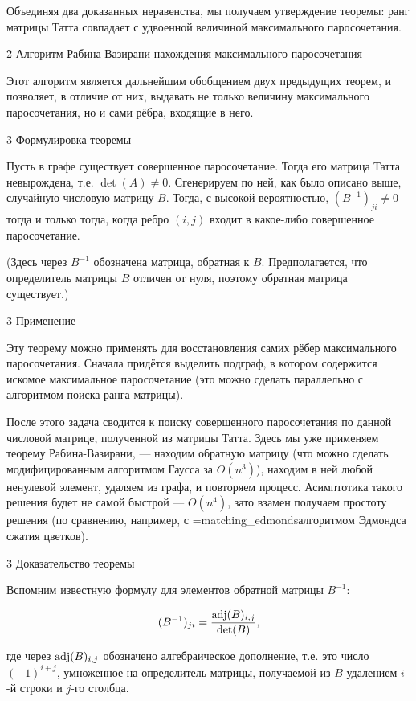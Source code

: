 Объединяя два доказанных неравенства, мы получаем утверждение теоремы: ранг матрицы Татта совпадает с удвоенной величиной максимального паросочетания.


\h2{ Алгоритм Рабина-Вазирани нахождения максимального паросочетания }

Этот алгоритм является дальнейшим обобщением двух предыдущих теорем, и позволяет, в отличие от них, выдавать не только величину максимального паросочетания, но и сами рёбра, входящие в него.


\h3{ Формулировка теоремы }

Пусть в графе существует совершенное паросочетание. Тогда его матрица Татта невырождена, т.е. $\det(A) \ne 0$. Сгенерируем по ней, как было описано выше, случайную числовую матрицу $B$. Тогда, с высокой вероятностью, $(B^{-1})_{ji} \ne 0$ тогда и только тогда, когда ребро $(i,j)$ входит в какое-либо совершенное паросочетание.

(Здесь через $B^{-1}$ обозначена матрица, обратная к $B$. Предполагается, что определитель матрицы $B$ отличен от нуля, поэтому обратная матрица существует.)


\h3{ Применение }

Эту теорему можно применять для восстановления самих рёбер максимального паросочетания. Сначала придётся выделить подграф, в котором содержится искомое максимальное паросочетание (это можно сделать параллельно с алгоритмом поиска ранга матрицы).

После этого задача сводится к поиску совершенного паросочетания по данной числовой матрице, полученной из матрицы Татта. Здесь мы уже применяем теорему Рабина-Вазирани, --- находим обратную матрицу (что можно сделать модифицированным алгоритмом Гаусса за $O (n^3)$), находим в ней любой ненулевой элемент, удаляем из графа, и повторяем процесс. Асимптотика такого решения будет не самой быстрой --- $O (n^4)$, зато взамен получаем простоту решения (по сравнению, например, с \algohref=matching_edmonds{алгоритмом Эдмондса сжатия цветков}).


\h3{ Доказательство теоремы }

Вспомним известную формулу для элементов обратной матрицы $B^{-1}$:

$$ (B^{-1})_{ji} = \frac{ {\rm adj}(B)_{i,j} }{ \det(B) }, $$

где через ${\rm adj}(B)_{i,j}$ обозначено алгебраическое дополнение, т.е. это число $(-1)^{i+j}$, умноженное на определитель матрицы, получаемой из $B$ удалением $i$-й строки и $j$-го столбца.

